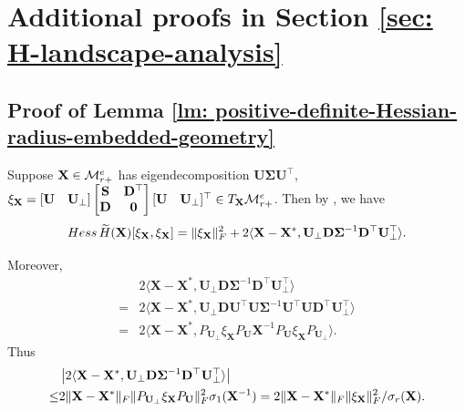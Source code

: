 \documentclass[11pt]{article}
\newcommand{\0}{{\mathbf{0}}}
\newcommand{\1}{{\mathbf{1}}}
\newcommand{\X}{{\mathbf{X}}}
\newcommand{\D}{{\mathbf{D}}}
\renewcommand{\S}{{\mathbf{S}}}
\newcommand{\U}{{\mathbf{U}}}
\newcommand{\cM}{{\cal M}}
\newcommand{\bSigma}{\boldsymbol{\Sigma}}
\newcommand{\Hess}{{\rm Hess}}
\newcommand{\F}{{\rm F}}
\begin{document}
\section{Additional proofs in Section \ref{sec: H-landscape-analysis}} \label{proof-sec: add-H-landscape}


\subsection{ Proof of Lemma \ref{lm: positive-definite-Hessian-radius-embedded-geometry} }
\label{app:Lemma5}

Suppose $\X \in \cM^e_{r+}$ has eigendecomposition $\U \bSigma \U^\top$, $\xi_\X = [\U \quad \U_\perp] \begin{bmatrix}
			\S & \D^\top\\
			\D & \0
		\end{bmatrix} [\U \quad \U_\perp]^\top \in T_{\X}\cM^e_{r+}$. Then by \cite[Proposition 2]{luo2021nonconvex}, we have
	\begin{equation*}
		\Hess\, \widetilde{H}(\X)[\xi_\X, \xi_\X] = \|\xi_\X\|_\F^2 + 2\langle \X - \X^* , \U_\perp  \D \bSigma^{-1} \D^\top \U_\perp^\top \rangle.
	\end{equation*}
	
	Moreover,
	\begin{equation*}
		\begin{split}
			& 2\langle \X - \X^*  ,  \U_\perp  \D \bSigma^{-1} \D^\top \U_\perp^\top \rangle \\
			= & 2\langle \X - \X^*  ,  \U_\perp  \D \U^\top \U \bSigma^{-1}  \U^\top \U \D^\top\U_\perp^\top \rangle \\
			= & 2\langle \X - \X^*  ,  P_{\U_\perp} \xi_\X P_\U  \X^{-1} P_\U \xi_\X  P_{\U_\perp}  \rangle.
		\end{split}
	\end{equation*}
		Thus
		\begin{equation*}
		\begin{split}
			& \left| 2\langle \X - \X^*  ,  \U_\perp  \D \bSigma^{-1} \D^\top \U_\perp^\top \rangle\right| \\
			 \leq & 2 \|\X - \X^*\|_\F \| P_{\U_\perp} \xi_\X P_\U \|_\F^2 \sigma_1(\X^{-1}) = 2 \|\X - \X^*\|_\F \| \xi_\X \|_\F^2/ \sigma_r(\X).
		\end{split}
		\end{equation*}
		
\end{document}

